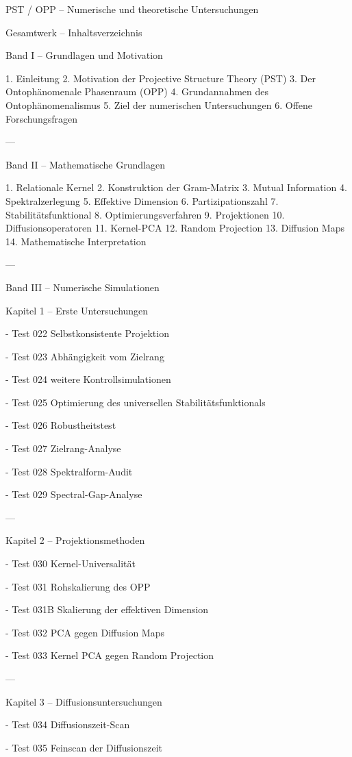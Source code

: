 PST / OPP – Numerische und theoretische Untersuchungen

Gesamtwerk – Inhaltsverzeichnis

Band I – Grundlagen und Motivation

1. Einleitung
2. Motivation der Projective Structure Theory (PST)
3. Der Ontophänomenale Phasenraum (OPP)
4. Grundannahmen des Ontophänomenalismus
5. Ziel der numerischen Untersuchungen
6. Offene Forschungsfragen

---

Band II – Mathematische Grundlagen

1. Relationale Kernel
2. Konstruktion der Gram-Matrix
3. Mutual Information
4. Spektralzerlegung
5. Effektive Dimension
6. Partizipationszahl
7. Stabilitätsfunktional
8. Optimierungsverfahren
9. Projektionen
10. Diffusionsoperatoren
11. Kernel-PCA
12. Random Projection
13. Diffusion Maps
14. Mathematische Interpretation

---

Band III – Numerische Simulationen

Kapitel 1 – Erste Untersuchungen

- Test 022
  Selbstkonsistente Projektion

- Test 023
  Abhängigkeit vom Zielrang

- Test 024
  weitere Kontrollsimulationen

- Test 025
  Optimierung des universellen Stabilitätsfunktionals

- Test 026
  Robustheitstest

- Test 027
  Zielrang-Analyse

- Test 028
  Spektralform-Audit

- Test 029
  Spectral-Gap-Analyse

---

Kapitel 2 – Projektionsmethoden

- Test 030
  Kernel-Universalität

- Test 031
  Rohskalierung des OPP

- Test 031B
  Skalierung der effektiven Dimension

- Test 032
  PCA gegen Diffusion Maps

- Test 033
  Kernel PCA gegen Random Projection

---

Kapitel 3 – Diffusionsuntersuchungen

- Test 034
  Diffusionszeit-Scan

- Test 035
  Feinscan der Diffusionszeit

